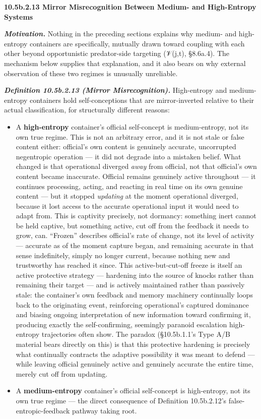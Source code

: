 \documentclass[
]{article}
\begin{document}
\textbf{10.5b.2.13 Mirror Misrecognition Between Medium- and
High-Entropy Systems}

\emph{\textbf{Motivation.}} Nothing in the preceding sections explains
why medium- and high-entropy containers are specifically, mutually drawn
toward coupling with each other beyond opportunistic predator-side
targeting (𝒱(j,t), §8.6a.4). The mechanism below supplies that
explanation, and it also bears on why external observation of these two
regimes is unusually unreliable.

\emph{\textbf{Definition 10.5b.2.13 (Mirror Misrecognition).}}
High-entropy and medium-entropy containers hold self-conceptions that
are mirror-inverted relative to their actual classification, for
structurally different reasons:

\begin{itemize}
\item
  A \textbf{high-entropy} container's official self-concept is
  medium-entropy, not its own true regime. This is not an arbitrary
  error, and it is not stale or false content either: official's own
  content is genuinely accurate, uncorrupted negentropic operation ---
  it did not degrade into a mistaken belief. What changed is that
  operational diverged \emph{away} from official, not that official's
  own content became inaccurate. Official remains genuinely active
  throughout --- it continues processing, acting, and reacting in real
  time on its own genuine content --- but it stopped \emph{updating} at
  the moment operational diverged, because it lost access to the
  accurate operational input it would need to adapt from. This is
  captivity precisely, not dormancy: something inert cannot be held
  captive, but something active, cut off from the feedback it needs to
  grow, can. ``Frozen'' describes official's rate of change, not its
  level of activity --- accurate as of the moment capture began, and
  remaining accurate in that sense indefinitely, simply no longer
  current, because nothing new and trustworthy has reached it since.
  This active-but-cut-off freeze is itself an active protective strategy
  --- hardening into the source of knocks rather than remaining their
  target --- and is actively maintained rather than passively stale: the
  container's own feedback and memory machinery continually loops back
  to the originating event, reinforcing operational's captured dominance
  and biasing ongoing interpretation of new information toward
  confirming it, producing exactly the self-confirming, seemingly
  paranoid escalation high-entropy trajectories often show. The paradox
  (§10.5b.1.1's Type A/B material bears directly on this) is that this
  protective hardening is precisely what continually contracts the
  adaptive possibility it was meant to defend --- while leaving official
  genuinely active and genuinely accurate the entire time, merely cut
  off from updating.
\item
  A \textbf{medium-entropy} container's official self-concept is
  high-entropy, not its own true regime --- the direct consequence of
  Definition 10.5b.2.12's false-entropic-feedback pathway taking root.
\end{itemize}
\end{document}
